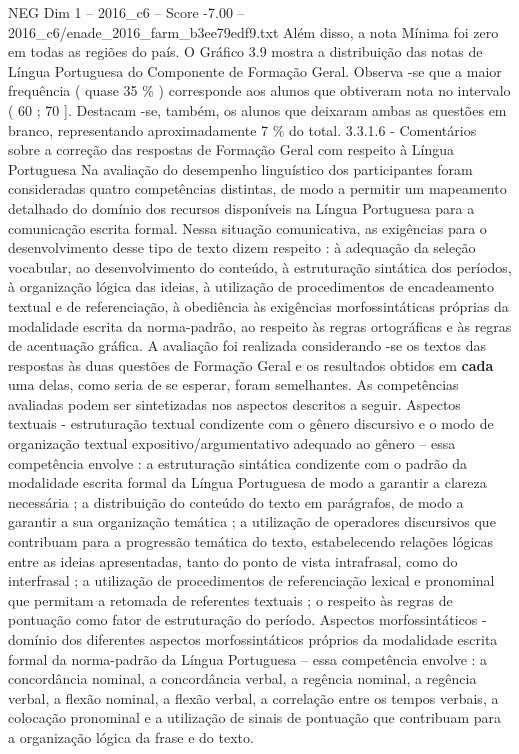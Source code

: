 \begin{textsample}{NEG Dim 1 – 2016\_c6 – Score -7.00 – 2016\_c6/enade\_2016\_farm\_b3ee79edf9.txt}
Além disso, a nota Mínima foi zero em todas as regiões do país.
O Gráfico 3.9 mostra a distribuição das notas de Língua Portuguesa do Componente de Formação Geral.
Observa -se que a maior frequência ( quase 35 \% ) corresponde aos alunos que obtiveram nota no intervalo ( 60 ; 70 ].
Destacam -se, também, os alunos que deixaram ambas as questões em branco, representando aproximadamente 7 \% do total. 3.3.1.6 - Comentários sobre a correção das respostas de Formação Geral com respeito à Língua Portuguesa Na avaliação do desempenho linguístico dos participantes foram consideradas quatro competências distintas, de modo a permitir um mapeamento detalhado do domínio dos recursos disponíveis na Língua Portuguesa para a comunicação escrita formal.
Nessa situação comunicativa, as exigências para o desenvolvimento desse tipo de texto dizem respeito : à adequação da seleção vocabular, ao desenvolvimento do conteúdo, à estruturação sintática dos períodos, à organização lógica das ideias, à utilização de procedimentos de encadeamento textual e de referenciação, à obediência às exigências morfossintáticas próprias da modalidade escrita da norma-padrão, ao respeito às regras ortográficas e às regras de acentuação gráfica.
A avaliação foi realizada considerando -se os textos das respostas às duas questões de Formação Geral e os resultados obtidos em \textbf{cada} uma delas, como seria de se esperar, foram semelhantes.
As competências avaliadas podem ser sintetizadas nos aspectos descritos a seguir.
Aspectos textuais - estruturação textual condizente com o gênero discursivo e o modo de organização textual expositivo/argumentativo adequado ao gênero – essa competência envolve : a estruturação sintática condizente com o padrão da modalidade escrita formal da Língua Portuguesa de modo a garantir a clareza necessária ; a distribuição do conteúdo do texto em parágrafos, de modo a garantir a sua organização temática ; a utilização de operadores discursivos que contribuam para a progressão temática do texto, estabelecendo relações lógicas entre as ideias apresentadas, tanto do ponto de vista intrafrasal, como do interfrasal ; a utilização de procedimentos de referenciação lexical e pronominal que permitam a retomada de referentes textuais ; o respeito às regras de pontuação como fator de estruturação do período.
Aspectos morfossintáticos - domínio dos diferentes aspectos morfossintáticos próprios da modalidade escrita formal da norma-padrão da Língua Portuguesa – essa competência envolve : a concordância nominal, a concordância verbal, a regência nominal, a regência verbal, a flexão nominal, a flexão verbal, a correlação entre os tempos verbais, a colocação pronominal e a utilização de sinais de pontuação que contribuam para a organização lógica da frase e do texto.

\end{textsample}
